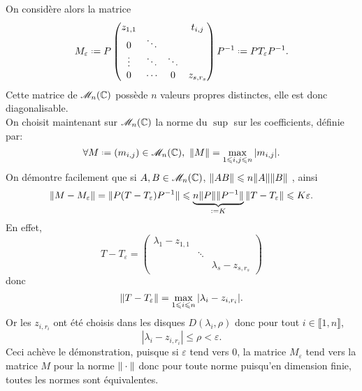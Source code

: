 \begin{preuve}
    On considère alors la matrice
    $$M_\varepsilon \defeq P 
    \begin{pmatrix}
        z_{1, 1} & & & t_{i,j} \\
        0 & \ddots & & \\
        \vdots & \ddots & \ddots & \\
        0 & \cdots & 0 & z_{s, r_s}
    \end{pmatrix}
    \Inv{P} \defeq P T_\varepsilon \Inv{P}.
    $$
    Cette matrice de $\mathscr{M}_n(\mathbb{C})$ possède $n$ valeurs propres distinctes, elle est donc diagonalisable. \\
    On choisit maintenant sur $\mathscr{M}_n(\mathbb{C})$ la norme du $\sup$ sur les coefficients, définie par:
    $$\forall M \defeq (m_{i,j}) \in \M_n(\C),\ \norme{M} = \max_{1 \leqslant i, j \leqslant n} |m_{i,j}|.$$
    On démontre facilement que si $A, B \in \mathscr{M}_n(\mathbb{C})$, $\Vert AB \Vert \leqslant n \Vert A \Vert \Vert B \Vert$ \note, ainsi
    $$\norme{M - M_\varepsilon} = \norme{P (T - T_\varepsilon) \Inv{P}} \leqslant \underbrace{n \norme{P} \norme{P^{-1}}}_{\defeq K} \norme{T - T_\varepsilon} \leqslant K \varepsilon.$$
    En effet, 
    $$
    T - T_\varepsilon = 
    \begin{pmatrix}
    \lambda_1 - z_{1, 1} &  & \\
    & \ddots & \\
    & & \lambda_s - z_{s, r_s}
    \end{pmatrix}
    $$
    donc
    $$\Vert T - T_\varepsilon \Vert = \max_{1 \leqslant i \leqslant n} |\lambda_i - z_{i, r_i}|.$$
    Or les $z_{i, r_i}$ ont été choisis dans les disques $D(\lambda_i, \rho)$ donc pour tout $i \in \llbracket 1, n \rrbracket$,
    $$|\lambda_i - z_{i, r_i}| \leqslant \rho < \varepsilon.$$
    Ceci achève le démonstration, puisque si $\varepsilon$ tend vers $0$, la matrice $M_\varepsilon$ tend vers la matrice $M$ pour la norme $\Vert \cdot \Vert$ donc pour toute norme puisqu'en dimension finie, toutes les normes sont équivalentes.
\end{preuve}
